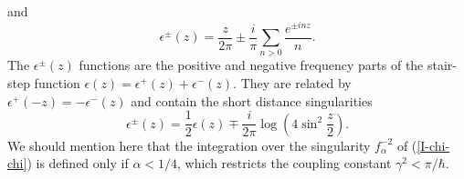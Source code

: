 \documentclass[a4paper,12pt]{article}
\begin{document}
and
\begin{equation}\label{eps_pm}
\epsilon^{\pm}(z)=
\frac{z}{2\pi}\pm\frac{i}{\pi}\sum_{n>0}\frac{e^{\pm inz}}{n}.
\end{equation}
The $\epsilon^{\pm}(z)$ functions are the positive and negative
frequency parts of the stair-step function
$\epsilon(z)=\epsilon^+(z)+\epsilon^-(z)$. They are related by
$\epsilon^+(-z)=-\epsilon^-(z)$ and contain the short distance
singularities
\begin{equation}\label{eps_pm-eps}
\epsilon^{\pm}(z)=\frac{1}{2}
\epsilon(z)\mp \frac{i}{2\pi}\log\left(4\sin^2\frac{z}{2}\right).
\end{equation}
We should mention here that the integration over the singularity
$f_\alpha^{-2}$ of (\ref{I-chi-chi}) is defined only if $\alpha <
1/4$, which restricts the coupling constant
$\gamma^2<\pi/\hbar$.
\end{document}

